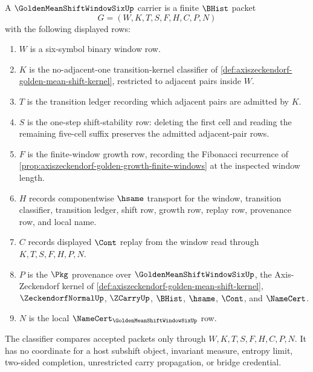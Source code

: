 \begin{definition}
\label{def:golden-mean-shift-window-six-carrier}
A $\GoldenMeanShiftWindowSixUp$ carrier is a finite $\BHist$ packet
$$
G=(W,K,T,S,F,H,C,P,N)
$$
with the following displayed rows:
\begin{enumerate}
\item $W$ is a six-symbol binary window row.
\item $K$ is the no-adjacent-one transition-kernel classifier of \autoref{def:axiszeckendorf-golden-mean-shift-kernel}, restricted to adjacent pairs inside $W$.
\item $T$ is the transition ledger recording which adjacent pairs are admitted by $K$.
\item $S$ is the one-step shift-stability row: deleting the first cell and reading the remaining five-cell suffix preserves the admitted adjacent-pair rows.
\item $F$ is the finite-window growth row, recording the Fibonacci recurrence of \autoref{prop:axiszeckendorf-golden-growth-finite-windows} at the inspected window length.
\item $H$ records componentwise $\hsame$ transport for the window, transition classifier, transition ledger, shift row, growth row, replay row, provenance row, and local name.
\item $C$ records displayed $\Cont$ replay from the window read through $K,T,S,F,H,P,N$.
\item $P$ is the $\Pkg$ provenance over $\GoldenMeanShiftWindowSixUp$, the Axis-Zeckendorf kernel of \autoref{def:axiszeckendorf-golden-mean-shift-kernel}, $\ZeckendorfNormalUp$, $\ZCarryUp$, $\BHist$, $\hsame$, $\Cont$, and $\NameCert$.
\item $N$ is the local $\NameCert_{\GoldenMeanShiftWindowSixUp}$ row.
\end{enumerate}
The classifier compares accepted packets only through $W,K,T,S,F,H,C,P,N$. It has no coordinate for a host subshift object, invariant measure, entropy limit, two-sided completion, unrestricted carry propagation, or bridge credential.
\end{definition}

